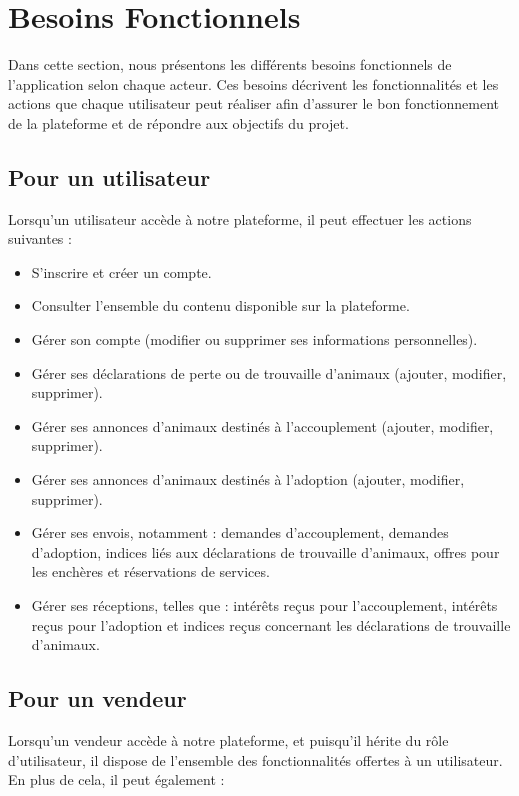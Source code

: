 \section{Besoins Fonctionnels}  
Dans cette section, nous présentons les différents besoins fonctionnels de l’application selon chaque acteur. Ces besoins décrivent les fonctionnalités et les actions que chaque utilisateur peut réaliser afin d’assurer le bon fonctionnement de la plateforme et de répondre aux objectifs du projet. 
\subsection{Pour un utilisateur}

Lorsqu’un utilisateur accède à notre plateforme, il peut effectuer les actions suivantes :

\begin{itemize}
    \item S’inscrire et créer un compte.
    \item Consulter l’ensemble du contenu disponible sur la plateforme.
    \item Gérer son compte (modifier ou supprimer ses informations personnelles).
    \item Gérer ses déclarations de perte ou de trouvaille d’animaux (ajouter, modifier, supprimer).
    \item Gérer ses annonces d’animaux destinés à l’accouplement (ajouter, modifier, supprimer).
    \item Gérer ses annonces d’animaux destinés à l’adoption (ajouter, modifier, supprimer).
    \item Gérer ses envois, notamment : demandes d’accouplement, demandes d’adoption, indices liés aux déclarations de trouvaille d’animaux, offres pour les enchères et réservations de services.
    \item Gérer ses réceptions, telles que : intérêts reçus pour l’accouplement, intérêts reçus pour l’adoption et indices reçus concernant les déclarations de trouvaille d’animaux.
\end{itemize} 

\subsection{Pour un vendeur}

Lorsqu’un vendeur accède à notre plateforme, et puisqu’il hérite du rôle d’utilisateur, il dispose de l’ensemble des fonctionnalités offertes à un utilisateur. En plus de cela, il peut également :

